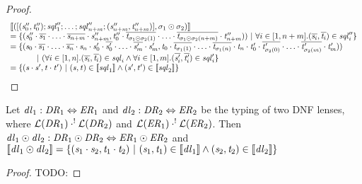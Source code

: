 \documentclass[numbers,10pt,preprint\ifanon ,nocopyrightspace\fi]{sigplanconf}
\begin{document}
\begin{proof}
  \[
    \begin{array}{l}
      [ \! [([(\mathit{s}_0'',\mathit{t}_0'');\mathit{sql}_1'';
      \ldots;
      \mathit{sql}_{n+m}'';(\mathit{s}_{n+m}'',\mathit{t}_{n+m}'')],
      \sigma_1\odot\sigma_2)] \! ]\\
      = \{(\mathit{s}_0''\cdot\overline{\mathit{s}_1}\cdot
      \ldots\cdot\overline{\mathit{s}_{n+m}}\cdot\mathit{s}_{n+m}'',
      \mathit{t}_0''\cdot\overline{\mathit{t}_{\sigma_1\odot\sigma_2(1)}}\cdot
      \ldots\cdot\overline{\mathit{t}_{\sigma_1\odot\sigma_2(n+m)}}\cdot\mathit{t}_{n+m}''))~|~
      \forall i\in[1,n+m].(\overline{\mathit{s}_i},\overline{\mathit{t}_i})\in\mathit{sql}_i''\}\\
      = \{(\mathit{s}_0\cdot\overline{\mathit{s}_1}\cdot\ldots\cdot
      \overline{\mathit{s}_n}\cdot\mathit{s}_n\cdot\mathit{s}_0'\cdot\overline{\mathit{s}_{0}'}\cdot
      \ldots\cdot\overline{\mathit{s}_m'}\cdot\mathit{s}_m',
      \mathit{t}_0\cdot\overline{\mathit{t}_{\sigma_1(1)}}\cdot\ldots\cdot
      \overline{\mathit{t}_{\sigma_1(n)}}\cdot\mathit{t}_n\cdot\mathit{t}_0'
      \cdot\overline{\mathit{t}_{\sigma_2(0)}'}\cdot
      \ldots\cdot\overline{\mathit{t}_{\sigma_2(m)}'}\cdot\mathit{t}_m'))\\
      \hspace*{3em}~|~
      (\forall i\in[1,n].
      (\overline{\mathit{s}_i},\overline{\mathit{t}_i})\in\mathit{sql}_i
      \wedge
      \forall i\in[1,m].
      (\overline{\mathit{s}_i'},\overline{\mathit{t}_i'})\in\mathit{sql}_i'\}\\
      = \{(\mathit{s}\cdot\mathit{s}',\mathit{t}\cdot\mathit{t}')~|~
      (\mathit{s},\mathit{t})\in[ \! [\mathit{sql}_1] \! ]
      \wedge
      (\mathit{s}',\mathit{t}')\in[ \! [\mathit{sql}_2] \! ]\}
    \end{array}
  \]
\end{proof}

\begin{lemma}
  \label{lem:typ_sem_concat}
  Let $\mathit{dl}_1 : \mathit{DR}_1 \Leftrightarrow \mathit{ER}_1$ and
  $\mathit{dl}_2 : \mathit{DR}_2 \Leftrightarrow \mathit{ER}_2$ be the typing of
  two DNF lenses, where
  $\mathcal{L}(\mathit{DR}_1) \cdot^! \mathcal{L}(\mathit{DR}_2)$ and
  $\mathcal{L}(\mathit{ER}_1) \cdot^! \mathcal{L}(\mathit{ER}_2)$.
  Then $\mathit{dl}_1\odot\mathit{dl}_2 :
  \mathit{DR}_1\odot\mathit{DR}_2 \Leftrightarrow
  \mathit{ER}_1\odot\mathit{ER}_2$ and
  $[ \! [\mathit{dl}_1\odot\mathit{dl}_2] \! ] =
  \{(\mathit{s}_1\cdot\mathit{s}_2,\mathit{t}_1\cdot\mathit{t}_2) ~|~
    (\mathit{s}_1,\mathit{t}_1)\in[ \! [\mathit{dl}_1] \! ]
    \wedge(\mathit{s}_2,\mathit{t}_2)\in[ \! [\mathit{dl}_2] \! ]\}$
\end{lemma}
\begin{proof}
  TODO:
\end{proof}
\end{document}
